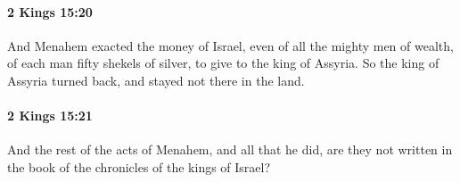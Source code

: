 		\paragraph{2 Kings 15:20} %
			\label{2KINGS-15-20}

			And Menahem exacted the money of Israel, even of all the mighty men of wealth, of each man fifty shekels of silver, to give to the king of Assyria. So the king of Assyria turned back, and stayed not there in the land.


		\paragraph{2 Kings 15:21} %
			\label{2KINGS-15-21}

			And the rest of the acts of Menahem, and all that he did, are they not written in the book of the chronicles of the kings of Israel?


